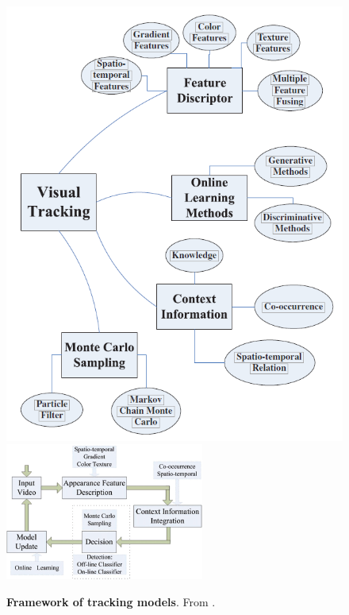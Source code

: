 \begin{figure}
   \hspace{-2mm}
   \includegraphics[width=0.45\linewidth]{figures/yang2011recent_graph.png}
   \includegraphics[width=0.45\linewidth]{figures/yang2011recent_flowchart.png}
   \caption{\textbf{Framework of tracking models}. From \cite{avidan2004support}.}
   \label{fig:yang2011recent}
\end{figure}




